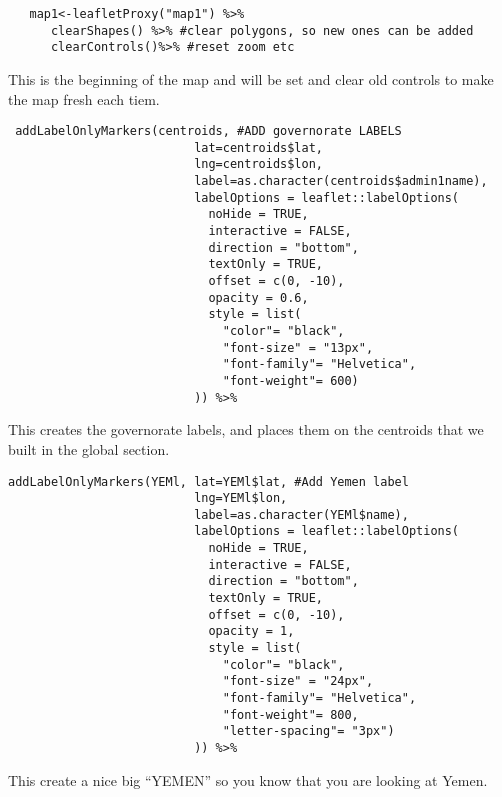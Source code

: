 \documentclass[
]{article}
\begin{document}
\begin{verbatim}
   map1<-leafletProxy("map1") %>%
      clearShapes() %>% #clear polygons, so new ones can be added
      clearControls()%>% #reset zoom etc
\end{verbatim}

This is the beginning of the map and will be set and clear old controls
to make the map fresh each tiem.

\begin{verbatim}
 addLabelOnlyMarkers(centroids, #ADD governorate LABELS
                          lat=centroids$lat, 
                          lng=centroids$lon, 
                          label=as.character(centroids$admin1name),
                          labelOptions = leaflet::labelOptions(
                            noHide = TRUE,
                            interactive = FALSE,
                            direction = "bottom",
                            textOnly = TRUE,
                            offset = c(0, -10),
                            opacity = 0.6,
                            style = list(
                              "color"= "black",
                              "font-size" = "13px",
                              "font-family"= "Helvetica",
                              "font-weight"= 600)
                          )) %>%
\end{verbatim}

This creates the governorate labels, and places them on the centroids
that we built in the global section.

\begin{verbatim}
addLabelOnlyMarkers(YEMl, lat=YEMl$lat, #Add Yemen label 
                          lng=YEMl$lon, 
                          label=as.character(YEMl$name),
                          labelOptions = leaflet::labelOptions(
                            noHide = TRUE,
                            interactive = FALSE,
                            direction = "bottom",
                            textOnly = TRUE,
                            offset = c(0, -10),
                            opacity = 1,
                            style = list(
                              "color"= "black",
                              "font-size" = "24px",
                              "font-family"= "Helvetica",
                              "font-weight"= 800,
                              "letter-spacing"= "3px")
                          )) %>%
\end{verbatim}

This create a nice big ``YEMEN'' so you know that you are looking at
Yemen.
\end{document}
